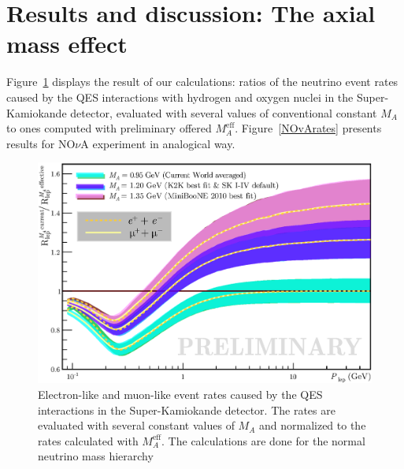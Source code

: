 \section{Results and discussion: The axial mass effect}
Figure~\ref{SKrates} displays the result of our calculations: ratios of the neutrino event rates caused by the QES interactions with hydrogen and oxygen nuclei in the Super-Kamiokande detector, evaluated with several values of conventional constant $M_{A}$ to ones computed with preliminary offered $M_{A}^{\mathrm{eff}}$. Figure~\ref{NOvArates} presents results for NO$\nu$A experiment in analogical way.

\begin{figure}[htb!]
\includegraphics[width=\columnwidth]{./SK/cvsv2lmn_all2.eps}
\caption{\label{SKrates}Electron-like and muon-like event rates caused by the QES interactions in the Super-Kamiokande detector. The rates are evaluated with several constant values of $M_{A}$ and normalized to the rates calculated with $M_{A}^{\mathrm{eff}}$. The calculations are done for the normal neutrino mass hierarchy}
\end{figure}

